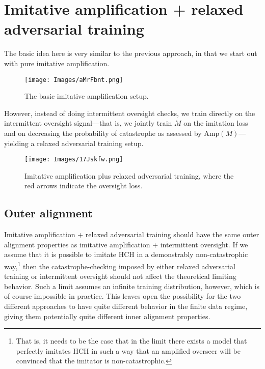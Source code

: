 \documentclass[
  onecolumn,
  natbib,
]{miri-tech-article}
\begin{document}
\section{Imitative amplification + relaxed adversarial training}
\label{sec:3}

The basic idea here is very similar to the previous approach, in that we start out with pure imitative amplification.

\vspace{4mm}
\begin{figure}[h!]
  \centering
  \texttt{[image: Images/aMrFbnt.png]}
  \caption{The basic imitative amplification setup.}
\end{figure}
\vspace{2mm}

\noindent However, instead of doing intermittent oversight checks, we train directly on the intermittent oversight signal---that is, we jointly train $M$ on the imitation loss and on decreasing the probability of catastrophe as assessed by $\text{Amp}(M)$---yielding a relaxed adversarial training setup.\cite{relaxed}

\newpage

\vspace{4mm}
\begin{figure}[h!]
  \centering
  \texttt{[image: Images/17Jskfw.png]}
  \caption{Imitative amplification plus relaxed adversarial training, where the red arrows indicate the oversight loss.}
\end{figure}
\vspace{2mm}

\subsection{Outer alignment} Imitative amplification + relaxed adversarial training should have the same outer alignment properties as imitative amplification + intermittent oversight. If we assume that it is possible to imitate HCH in a demonstrably non-catastrophic way,\footnote{That is, it needs to be the case that in the limit there exists a model that perfectly imitates HCH in such a way that an amplified overseer will be convinced that the imitator is non-catastrophic.} then the catastrophe-checking imposed by either relaxed adversarial training or intermittent oversight should not affect the theoretical limiting behavior. Such a limit assumes an infinite training distribution, however, which is of course impossible in practice. This leaves open the possibility for the two different approaches to have quite different behavior in the finite data regime, giving them potentially quite different inner alignment properties.
\end{document}
